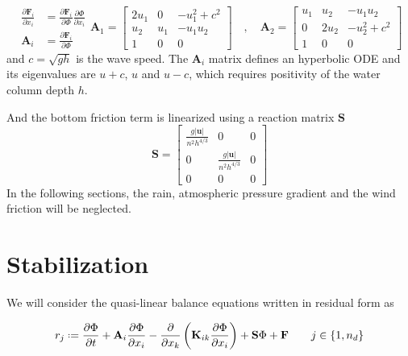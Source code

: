\documentclass[a4paper,12pt]{article}
\newcommand{\pder}[2]{\frac{\partial#1}{\partial#2}}
\newcommand{\abs}[1]{\lvert#1\rvert}
\newcommand{\defeq}{\mathrel{\vcenter{\baselineskip0.5ex\lineskiplimit0pt\hbox{\scriptsize.}\hbox{\scriptsize.}}}=}
\begin{document}
\begin{subequations}
\begin{align}
\pder{\mathbf{F}_i}{x_i} &= \pder{\mathbf{F}_i}{\Phi}\pder{\Phi}{x_i} \\
\mathbf{A}_i &= \pder{\mathbf{F}_i}{\Phi}
\end{align}
\begin{equation}
\mathbf{A}_1 = \left[\begin{matrix}
        2u_1 & 0   & -u_1^2 + c^2 \\
        u_2  & u_1 & -u_1 u_2 \\
        1    & 0   & 0
    \end{matrix} \right]
\quad , \quad
\mathbf{A}_2 = \left[\begin{matrix}
        u_1 & u_2  & -u_1 u_2 \\
        0   & 2u_2 & -u_2^2 + c^2 \\
        1   & 0    & 0
    \end{matrix} \right]
\end{equation}
\end{subequations}
and $c=\sqrt{gh}$ is the wave speed. The $\mathbf{A}_i$ matrix defines an hyperbolic ODE and its eigenvalues are $u+c$, $u$ and $u-c$, which requires positivity of the water column depth $h$.

And the bottom friction term is linearized using a reaction matrix $\mathbf{S}$
\begin{equation}
\mathbf{S} = \left[\begin{matrix}
    \frac{g\abs{\mathbf{u}}}{n^2h^{4/3}} & 0 & 0 \\
    0 & \frac{g\abs{\mathbf{u}}}{n^2h^{4/3}} & 0 \\
    0 & 0 & 0
\end{matrix}\right]
\end{equation}
In the following sections, the rain, atmospheric pressure gradient and the wind friction will be neglected.

\section{Stabilization}\label{sec:stabilization}

We will consider the quasi-linear balance equations written in residual form as

\begin{equation} \label{residual}
r_j \defeq 
  \pder{\Phi}{t} + \mathbf{A}_i\pder{\Phi}{x_i}
  -\pder{}{x_k}\left(\mathbf{K}_{ik}\pder{\Phi}{x_i}\right) + \mathbf{S}\Phi + \mathbf{F} \qquad j\in\{1,n_d\}
\end{equation}
\end{document}
